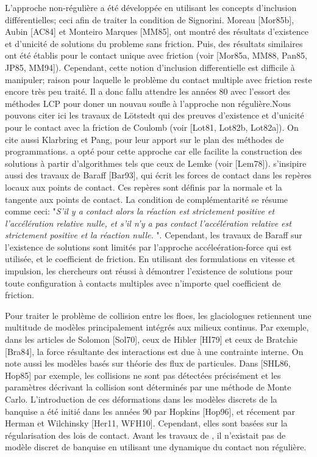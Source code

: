 L'approche non-régulière a été développée en utilisant les concepts d'inclusion différentielles; ceci afin de traiter la condition de Signorini. Moreau [Mor85b], Aubin [AC84] et Monteiro Marques [MM85], ont montré des résultats d’existence et d’unicité de solutions du probleme sans friction. Puis, des résultats similaires ont été établis pour le contact unique avec friction (voir [Mor85a, MM88, Pan85, JP85, MM94]). Cependant, cette notion d'inclusion differentielle est difficile à manipuler; raison pour laquelle le problème du contact multiple avec friction reste encore très peu
traité.  Il a donc fallu attendre les années 80 avec l'essort des méthodes LCP pour doner un nouvau soufle à l'approche non régulière.Nous pouvons citer ici les travaux de Lötstedt qui des preuves d’existence et d’unicité pour le contact avec la friction de Coulomb (voir [Lot81, Lot82b, Lot82a]). On cite aussi Klarbring et Pang, pour leur apport sur le plan des méthodes de programmations. \parencite{rabatel2015thesis} a opté pour cette approche car elle facilite la construction des solutions à partir d’algorithmes tels que ceux de Lemke (voir [Lem78]). \citeauthor{rabatel2015thesis} s'insipire aussi des travaux de Baraff [Bar93], qui écrit les forces de contact dans les repères locaux aux points de contact. Ces repères sont définis par la normale et la tangente aux points de contact. La condition de complémentarité se résume comme ceci: "\textit{S’il y a contact alors la réaction est strictement positive et l’accélération relative nulle, et s’il n’y a pas contact l’accélération relative est strictement positive et la réaction nulle.
}". Cependant, les travaux de Baraff sur l'existence de solutions sont limités par l'approche accéleération-force qui est utilisée, et le coefficient de friction. En utilisant des formulations en vitesse et impulsion, les chercheurs ont réussi à démontrer l’existence de solutions pour toute configuration à contacts multiples avec n’importe quel coefficient de friction.


Pour traiter le problème de collision entre les floes, les glaciologues retiennent une multitude de  modèles principalement intégrés aux milieux continus. Par exemple, dans les articles de Solomon [Sol70], ceux de Hibler [HI79] et ceux de Bratchie [Bra84], la force résultante des interactions est due à une contrainte interne. On note aussi les modèles basés sur théorie des flux de particules. Dans
[SHL86, Hop85] par exemple, les collisions ne sont pas détectées précisément et les paramètres décrivant la collision sont déterminés par une méthode de Monte Carlo. L'introduction de ces déformations dans les modèles discrets de la banquise a été initié dans les années 90 par Hopkins [Hop96], et récement par Herman et Wilchinsky [Her11, WFH10]. Cependant, elles sont basées sur
la régularisation des lois de contact. Avant les travaux de \citeauthor{rabatel2015thesis}, il n'existait pas de modèle discret de banquise en utilisant une dynamique du contact non régulière.


